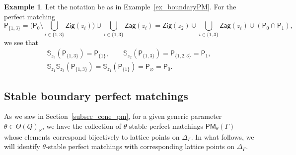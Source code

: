 \documentclass[pdftex]{sigma}
\numberwithin{equation}{section}
\theoremstyle{definition}
\newtheorem{Example}[Theorem]{Example}
\newcommand{\RR}{\mathbb{R}}
\newcommand{\BS}{\mathbb{S}}
\newcommand{\sfP}{\mathsf{P}}
\newcommand{\Zig}{\mathsf{Zig}}
\newcommand{\Zag}{\mathsf{Zag}}
\newcommand{\PM}{\mathsf{PM}}
\begin{document}
\begin{Example}
Let the notation be as in Example~\ref{ex_boundaryPM}.
For the perfect matching
\[
\sfP_{\{1,3\}}=\biggl(\sfP_0{\setminus}\bigcup_{i\in \{1,3\}}\Zig(z_i)\biggr)\cup\bigcup_{i\in \{1,3\}}\Zag(z_i)
=\Zig(z_2)\cup\bigcup_{i\in \{1,3\}}\Zag(z_i)\cup (\sfP_0\cap\sfP_1 ),
\]
we see that
\begin{gather*}
\BS_{z_3}(\sfP_{\{1,3\}})=\sfP_{\{1\}}, \qquad \BS_{z_2}(\sfP_{\{1,3\}})=\sfP_{\{1,2,3\}}=\sfP_1, \\
\BS_{z_1}\BS_{z_3}(\sfP_{\{1,3\}})=\BS_{z_1}(\sfP_{\{1\}})=\sfP_{\varnothing}=\sfP_0.
\end{gather*}
\end{Example}

\subsection{Stable boundary perfect matchings}

As we saw in Section~\ref{subsec_cone_pm}, for a given generic parameter $\theta\in\Theta(Q)_\RR$,
we have the collection of $\theta$-stable perfect matchings $\PM_\theta(\Gamma)$ whose elements correspond bijectively to lattice points on $\Delta_\Gamma$.
In what follows, we will identify $\theta$-stable perfect matchings with corresponding lattice points on $\Delta_\Gamma$.
\end{document}
